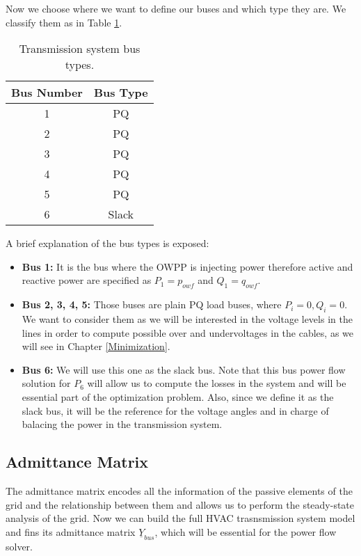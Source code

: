 \documentclass[a4paper,11pt, titlepage, twoside]{article}
\begin{document}
Now we choose where we want to define our buses and which type they are. We classify them as in Table \ref{table:bus_types}.
\begin{table}[h]
\centering
\begin{tabular}{c|c}
\hline
\textbf{Bus Number} & \textbf{Bus Type} \\
\hline
1 & PQ \\
2 & PQ \\
3 & PQ \\
4 & PQ \\
5 & PQ \\
6 & Slack \\
\hline
\end{tabular}
\caption{Transmission system bus types.}
\label{table:bus_types}
\end{table}

A brief explanation of the bus types is exposed:
\begin{itemize}
    \item \textbf{Bus 1:} It is the bus where the OWPP is injecting power therefore active and reactive power are specified as $P_1=p_{owf}$ and $Q_1=q_{owf}$.
    \item \textbf{Bus 2, 3, 4, 5:} Those buses are plain  PQ load buses, where $P_i=0, Q_i=0$. We want to consider them as we will be interested in the voltage levels in the lines in order
    to compute possible over and undervoltages in the cables, as we will see in Chapter \ref{Minimization}.
    \item \textbf{Bus 6:} We will use this one as the slack bus. Note that this bus power flow solution for $P_6$ will allow us to compute the losses in the system
    and will be essential part of the optimization problem. Also, since we define it as the slack bus, it will be the reference for the voltage angles and in charge of balacing the power in the transmission system. 
\end{itemize}
\subsection{Admittance Matrix}

The admittance matrix encodes all the information of the passive elements of the grid and the relationship between them and allows us to perform the steady-state 
analysis of the grid.
Now we can build the full HVAC trasnsmission system model and fins its admittance matrix $\underline{Y}_{bus}$, which will be essential
for the power flow solver.
\end{document}
